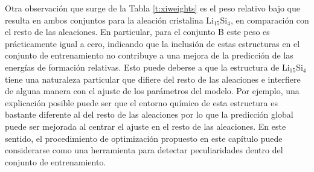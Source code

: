 Otra observación que surge de la Tabla \ref{t:xiweights} es el peso relativo bajo
que resulta en ambos conjuntos para la aleación cristalina Li$_{15}$Si$_4$, en 
comparación con el resto de las aleaciones. En particular, para el conjunto B este 
peso es prácticamente igual a cero, indicando que la inclusión de estas 
estructuras en el conjunto de entrenamiento no contribuye a una mejora de la 
predicción de las energías de formación relativas. Esto puede deberse a que la 
estructura de Li$_{15}$Si$_4$ tiene una naturaleza particular que difiere del 
resto de las aleaciones e interfiere de alguna manera con el ajuste de los 
parámetros del modelo. Por ejemplo, una explicación posible puede ser que el 
entorno químico de esta estructura es bastante diferente al del resto de las 
aleaciones por lo que la predicción global puede ser mejorada al centrar el 
ajuste en el resto de las aleaciones. En este sentido, el procedimiento de 
optimización propuesto en este capítulo puede considerarse como una herramienta 
para detectar peculiaridades dentro del conjunto de entrenamiento.
